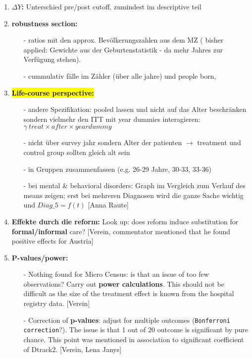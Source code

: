 \documentclass[11pt,a4paper]{article}
\begin{document}
{\begin{enumerate}
\item \textbf{$\Delta Y$:}\newline
Unterschied pre/post cutoff, zumindest im descriptive teil


\item \textbf{robustness section:}\vspace{-1em}
\begin{itemize}
	\item[-] ratios mit den approx. Bevölkerungszahlen aus dem MZ ( bisher applied: Gewichte aus der Geburtenstatistik - da mehr Jahres zur Verfügung stehen).
	\item[-] cummulativ fälle im Zähler (über alle jahre) und people born, 
\end{itemize}


\item \textbf{\hl{Life-course perspective:}}\vspace{-1em}
\begin{itemize}
	\item[-]andere Spezifikation: pooled lassen und nicht auf das Alter beschränken sondern 	vielmehr den ITT mit year dummies interagieren: \newline
	$\gamma\  treat \times after \times yeardummy$
	\item[-] nicht über survey jahr sondern Alter der patienten $\rightarrow$ treatment und control 	group sollten gleich alt sein
	\item[-] in Gruppen zusammenfassen (e.g. 26-29 Jahre, 30-33, 33-36)
	\item[-] bei mental \& behavioral disorders: Graph im Vergleich zum Verlauf des means zeigen; 	erst bei mehreren Diagnosen wird die ganze Sache wichtig und $Diag\_5 = f(t)$ [Anna Raute]
\end{itemize}


\item \textbf{Effekte durch die reform:}\newline
Look up: does reform induce substitution for \textbf{formal/informal} care? [Verein, commentator mentioned that he found positive effects for Austria] 


\item \textbf{P-values/power:}\vspace{-1em}
\begin{itemize}
	\item[-] Nothing found for Micro Census: is that an issue of too few observations? Carry out \textbf{power calculations}. This should not be difficult as the size of the treatment effect is known from the hospital registry data. [Verein]
	\item[-] Correction of \textbf{p-values}: adjust for multiple outcomes (\texttt{Bonferroni correction}?). The issue is that 1 out of 20 outcome is significant by pure chance. This point was mentioned in association to significant coefficient of Dtrack2. [Verein, Lena Janys]
\end{itemize}



\end{enumerate}}
\end{document}
